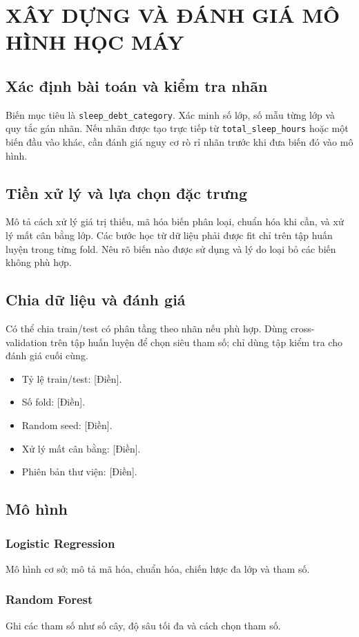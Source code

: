 \chapter{XÂY DỰNG VÀ ĐÁNH GIÁ MÔ HÌNH HỌC MÁY}
\section{Xác định bài toán và kiểm tra nhãn}
Biến mục tiêu là \texttt{sleep\_debt\_category}. Xác minh số lớp, số mẫu từng lớp và quy tắc gán nhãn. Nếu nhãn được tạo trực tiếp từ \texttt{total\_sleep\_hours} hoặc một biến đầu vào khác, cần đánh giá nguy cơ rò rỉ nhãn trước khi đưa biến đó vào mô hình.
\section{Tiền xử lý và lựa chọn đặc trưng}
Mô tả cách xử lý giá trị thiếu, mã hóa biến phân loại, chuẩn hóa khi cần, và xử lý mất cân bằng lớp. Các bước học từ dữ liệu phải được fit chỉ trên tập huấn luyện trong từng fold. Nêu rõ biến nào được sử dụng và lý do loại bỏ các biến không phù hợp.
\section{Chia dữ liệu và đánh giá}
Có thể chia train/test có phân tầng theo nhãn nếu phù hợp. Dùng cross-validation trên tập huấn luyện để chọn siêu tham số; chỉ dùng tập kiểm tra cho đánh giá cuối cùng.
\begin{itemize}[leftmargin=1.2cm]
\item Tỷ lệ train/test: [Điền].
\item Số fold: [Điền].
\item Random seed: [Điền].
\item Xử lý mất cân bằng: [Điền].
\item Phiên bản thư viện: [Điền].
\end{itemize}
\section{Mô hình}
\subsection{Logistic Regression}
Mô hình cơ sở; mô tả mã hóa, chuẩn hóa, chiến lược đa lớp và tham số.
\subsection{Random Forest}
Ghi các tham số như số cây, độ sâu tối đa và cách chọn tham số.
